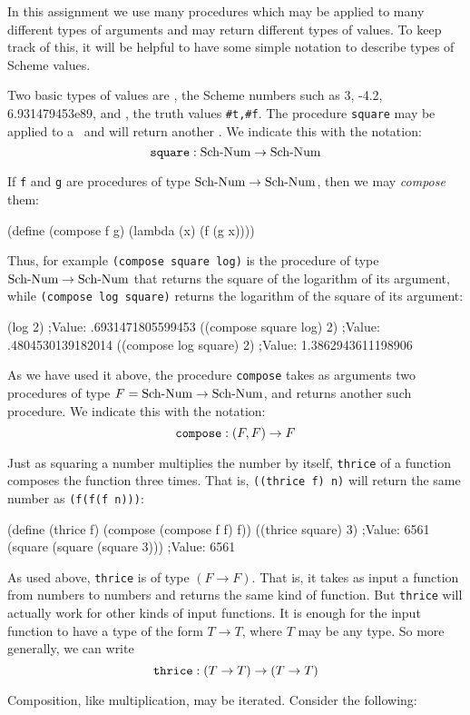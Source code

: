 In this assignment we use many procedures which may be applied to many
different types of arguments and may return different types of values.  To
keep track of this, it will be helpful to have some simple notation to
describe types of Scheme values.

Two basic types of values are \SN, the Scheme numbers such as 3,
-4.2, 6.931479453e89, and \SB, the truth values {\tt \#t,\#f}.
The procedure {\tt square} may be applied to a \SN\ and will return
another \SN.  We indicate this with the notation:
\[{\tt square} : \SN \to \SN \]

If {\tt f} and {\tt g}  are procedures of type $\SN \to \SN$, then we may
{\em compose} them:

\beginlisp
(define (compose f g)
  (lambda (x)
    (f (g x))))
\endlisp

\noindent
Thus, for example {\tt (compose square log)} is the procedure of type $\SN
\to \SN$ that returns the square of the logarithm of its argument, while
{\tt (compose log square)} returns the logarithm of the square of its
argument:

\beginlisp
(log 2)
;Value: .6931471805599453
\null
((compose square log) 2)
;Value: .4804530139182014
\null
((compose log square) 2)
;Value: 1.3862943611198906
\endlisp

\noindent
As we have used it above, the procedure {\tt compose} takes as arguments
two procedures of type $F = \SN \to \SN$, and returns another such
procedure.  We indicate this with the notation:
\[{\tt compose} : (F, F) \to F\]

Just as squaring a number multiplies the number by itself, {\tt thrice} of
a function composes the function three times.  That is, {\tt ((thrice f)
n)} will return the same number as {\tt (f(f(f n)))}:

\beginlisp
(define (thrice f)
  (compose (compose f f) f))
\null
((thrice square) 3)
;Value: 6561
\null
(square (square (square 3)))
;Value: 6561
\endlisp

As used above, {\tt thrice} is of type $(F \to F)$.  That is, it takes as
input a function from numbers to numbers and returns the same kind of
function.  But {\tt thrice} will actually work for other kinds of input
functions.  It is enough for the input function to have a type of the form
$T\to T$, where $T$ may be any type.  So more generally, we can write
\[\hbox{\tt thrice} : (T\to T) \to (T\to T) \]

Composition, like multiplication, may be iterated.  Consider 
the following:

